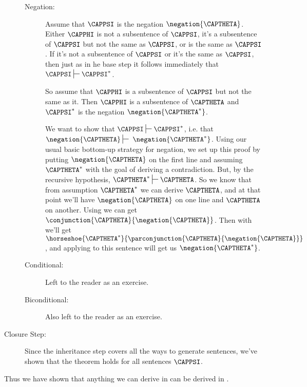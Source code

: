 \begin{PROOF}
\begin{description}
\begin{description}
\item[Negation:] Assume that $\CAPPSI$ is the negation $\negation{\CAPTHETA}$. 
Either $\CAPPHI$ is not a subsentence of $\CAPPSI$, it's a subsentence of $\CAPPSI$ but not the same as $\CAPPSI$, or is the same as $\CAPPSI$. 
If it's not a subsentence of $\CAPPSI$ or it's the same as $\CAPPSI$, then just as in he base step it follows immediately that $\CAPPSI\sststile{}{}\CAPPSI^*$.

So assume that $\CAPPHI$ is a subsentence of $\CAPPSI$ but not the same as it. 
Then $\CAPPHI$ is a subsentence of $\CAPTHETA$ and $\CAPPSI^*$ is the negation $\negation{\CAPTHETA^*}$.

We want to show that $\CAPPSI\sststile{}{}\CAPPSI^*$, i.e. that $\negation{\CAPTHETA}\sststile{}{}\;\negation{\CAPTHETA^*}$. Using our usual basic bottom-up strategy for negation, we set up this proof by putting $\negation{\CAPTHETA}$ on the first line and assuming $\CAPTHETA^*$ with the goal of deriving a contradiction. But, by the recursive hypothesis, $\CAPTHETA^*\sststile{}{}\CAPTHETA$. So we know that from assumption $\CAPTHETA^*$ we can derive $\CAPTHETA$, and at that point we'll have $\negation{\CAPTHETA}$ on one line and $\CAPTHETA$ on another. Using  we can get $\conjunction{\CAPTHETA}{\negation{\CAPTHETA}}$. Then with  we'll get $\horseshoe{\CAPTHETA^*}{\parconjunction{\CAPTHETA}{\negation{\CAPTHETA}}}$, and applying  to this sentence will get us $\negation{\CAPTHETA^*}$. 

\item[Conditional:] Left to the reader as an exercise.

\item[Biconditional:] Also left to the reader as an exercise.

\end{description}
\item[Closure Step:] Since the inheritance step covers all the ways to generate \GSL{} sentences, we've shown that the theorem holds for all \GSL{} sentences $\CAPPSI$.  
\end{description}
\end{PROOF}

\noindent{}Thus we have shown that anything we can derive in \GSDP{} can be derived in \GSD{}.

